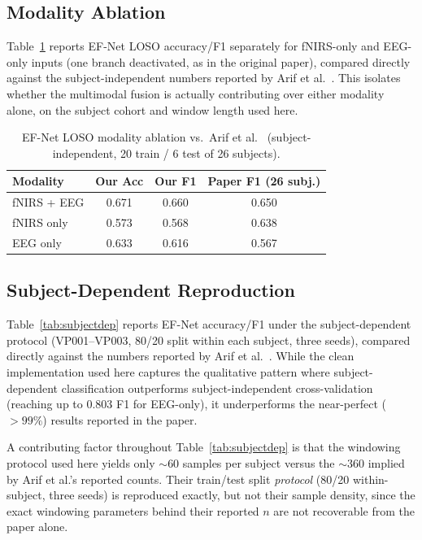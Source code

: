 \documentclass[journal]{IEEEtran}
\begin{document}
\subsection{Modality Ablation}
Table~\ref{tab:modality} reports EF-Net LOSO accuracy/F1 separately for fNIRS-only and EEG-only inputs (one branch deactivated, as in the original paper), compared directly against the subject-independent numbers reported by Arif et al.~\cite{arif2024}. This isolates whether the multimodal fusion is actually contributing over either modality alone, on the subject cohort and window length used here.

\begin{table}[t]
\centering
\caption{EF-Net LOSO modality ablation vs.\ Arif et al.~\cite{arif2024} (subject-independent, 20 train / 6 test of 26 subjects).}
\label{tab:modality}
\footnotesize
\begin{tabular}{l c c c}
\toprule
Modality & Our Acc & Our F1 & Paper F1 (26 subj.) \\
\midrule
fNIRS + EEG & 0.671 & 0.660 & 0.650 \\
fNIRS only & 0.573 & 0.568 & 0.638 \\
EEG only & 0.633 & 0.616 & 0.567 \\
\bottomrule
\end{tabular}
\end{table}

\subsection{Subject-Dependent Reproduction}
Table~\ref{tab:subjectdep} reports EF-Net accuracy/F1 under the subject-dependent protocol (VP001--VP003, 80/20 split within each subject, three seeds), compared directly against the numbers reported by Arif et al.~\cite{arif2024}. While the clean implementation used here captures the qualitative pattern where subject-dependent classification outperforms subject-independent cross-validation (reaching up to 0.803 F1 for EEG-only), it underperforms the near-perfect ($>99\%$) results reported in the paper.

A contributing factor throughout Table~\ref{tab:subjectdep} is that the windowing protocol used here yields only $\sim$60 samples per subject versus the $\sim$360 implied by Arif et al.'s reported counts. Their train/test split \emph{protocol} (80/20 within-subject, three seeds) is reproduced exactly, but not their sample density, since the exact windowing parameters behind their reported $n$ are not recoverable from the paper alone.
\end{document}
